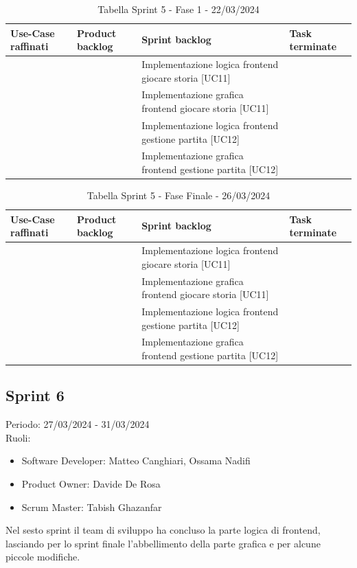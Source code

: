 \documentclass{article}
\begin{document}
\begin{table}[h]
    \centering
    \begin{tabularx}{\textwidth}{|X|X|X|X|}
        \hline
        \bf Use-Case raffinati & \bf Product backlog & \bf Sprint backlog & \bf Task terminate \\
        \hline
        & & Implementazione logica frontend giocare storia [UC11] & \\
        \hline
        & & Implementazione grafica frontend giocare storia [UC11] & \\
        \hline
        & & Implementazione logica frontend gestione partita [UC12] & \\
        \hline
        & & Implementazione grafica frontend gestione partita [UC12] & \\
        \hline
    \end{tabularx}
    \caption*{Tabella Sprint 5 - Fase 1 - 22/03/2024}
\end{table}

\begin{table}[h]
    \centering
    \begin{tabularx}{\textwidth}{|X|X|X|X|}
        \hline
        \bf Use-Case raffinati & \bf Product backlog & \bf Sprint backlog & \bf Task terminate \\
        \hline
        & & Implementazione logica frontend giocare storia [UC11] & \\
        \hline
        & & Implementazione grafica frontend giocare storia [UC11] & \\
        \hline
        & & Implementazione logica frontend gestione partita [UC12] & \\
        \hline
        & & Implementazione grafica frontend gestione partita [UC12] & \\
        \hline
    \end{tabularx}
    \caption*{Tabella Sprint 5 - Fase Finale - 26/03/2024}
\end{table}

\clearpage
\subsection{Sprint 6}
Periodo: 27/03/2024 - 31/03/2024\vspace*{7pt}\\
Ruoli:
\begin{itemize}[label = { }]
    \itemsep0em
    \item Software Developer: Matteo Canghiari, Ossama Nadifi 
    \item Product Owner: Davide De Rosa
    \item Scrum Master: Tabish Ghazanfar
\end{itemize}
Nel sesto sprint il team di sviluppo ha concluso la parte logica di frontend, lasciando per lo sprint finale l’abbellimento della parte grafica e per alcune piccole modifiche.
\end{document}
